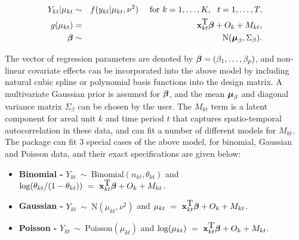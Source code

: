 \documentclass[article,shortnames,nojss]{jss}
\newcommand{\bd}[1]{\ensuremath{\mbox{\boldmath $#1$}}}
\begin{document}
\begin{eqnarray}
Y_{kt}|\mu_{kt}&\sim&f(y_{kt}|\mu_{kt},\nu^{2})~~~~\mbox{for }k=1,\ldots,K,~~t=1,\ldots,T,\label{equation likelihood}\\
g(\mu_{kt})&=&\mathbf{x}_{kt}^{\mbox{T}}\bd{\beta} + O_{k} + M_{kt},\nonumber\\
\bd{\beta}&\sim&\mbox{N}(\bd{\mu}_{\beta}, \Sigma_{\beta}).\nonumber
\end{eqnarray}

The vector of regression parameters are denoted by $\bd{\beta}=(\beta_{1},\ldots,\beta_{p})$, and non-linear covariate effects can be incorporated into the above model by including natural cubic spline or polynomial basis functions into the design matrix. A multivariate Gaussian prior is assumed for $\bd{\beta}$, and the mean $\bd{\mu}_{\beta}$ and diagonal variance matrix $\Sigma_{\beta}$ can be chosen by the user. The $M_{kt}$ term is a latent component for areal unit $k$ and time period $t$ that captures spatio-temporal autocorrelation in these data,  and  can fit a number of different models for $M_{kt}$. The package can fit 3 special cases of the above model, for binomial, Gaussian and Poisson data, and their exact specifications are given below:

\begin{itemize}
\item \textbf{Binomial - } $Y_{kt}~\sim~\mbox{Binomial}(n_{kt}, \theta_{kt})$ and $\log(\theta_{kt}/(1-\theta_{kt}))~=~\mathbf{x}_{kt}^{\mbox{T}}\bd{\beta} + O_{k} + M_{kt}$. 

\item \textbf{Gaussian - } $Y_{kt}~\sim~\mbox{N}(\mu_{kt}, \nu^{2})$ and $\mu_{kt}~=~\mathbf{x}_{kt}^{\mbox{T}}\bd{\beta} + O_{k} + M_{kt}$. 

\item \textbf{Poisson - } $Y_{kt}~\sim~\mbox{Poisson}(\mu_{kt})$ and $\log(\mu_{kt})~=~\mathbf{x}_{kt}^{\mbox{T}}\bd{\beta} + O_{k} + M_{kt}$. 
\end{itemize}
\end{document}
